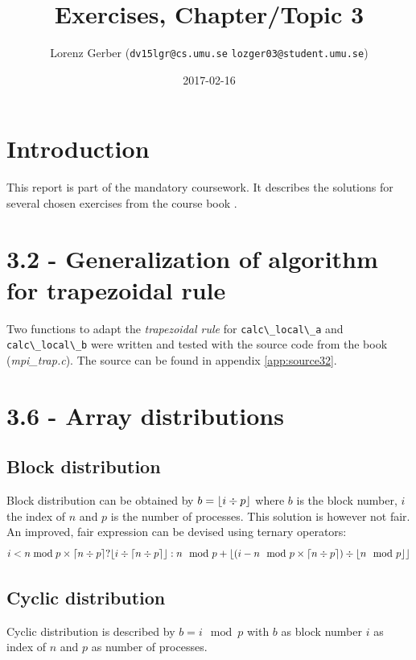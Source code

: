 \documentclass[a4paper,11pt,twoside]{article}
\title{Exercises, Chapter/Topic 3}
\author{Lorenz Gerber ({\tt{dv15lgr@cs.umu.se}} {\tt{lozger03@student.umu.se}})}
\date{2017-02-16}
\DeclarePairedDelimiter{\ceil}{\lceil}{\rceil}
\DeclarePairedDelimiter{\floor}{\lfloor}{\rfloor}
\begin{document}
\lstset{language=C}
\maketitle
\thispagestyle{empty}
\newpage
\tableofcontents
\thispagestyle{empty}
\newpage

\clearpage
{}

\section{Introduction}
This report is part of the mandatory coursework. It describes the solutions for several chosen exercises from the course book \cite{pacheco2011}.

\section{3.2 - Generalization of algorithm for trapezoidal rule}
Two functions to adapt the \textit{trapezoidal rule} for \verb+calc\_local\_a+ and \verb+calc\_local\_b+ were written and tested with the source code from the book (\textit{mpi\_trap.c}). The source can be found in appendix \ref{app:source32}.

\section{3.6 - Array distributions}

\subsection*{Block distribution}
Block distribution can be obtained by $b = \floor*{i \div p}$ where $b$ is the block number, $i$ the index of $n$ and $p$ is the number of processes. This solution is however not fair. An improved, fair expression can be devised using ternary operators:
\begin{equation*}
i< n\bmod p \times \ceil*{n \div p} ? \floor*{i \div \ceil*{n \div p}} : n\mod p + \floor*{(i -n\mod p \times \ceil*{n \div p}) \div \floor*{n\mod p}}
\end{equation*} 

\subsection*{Cyclic distribution}
Cyclic distribution is described by $b = i\mod p$ with $b$ as block number $i$ as index of $n$ and $p$ as number of processes. 
\end{document}
